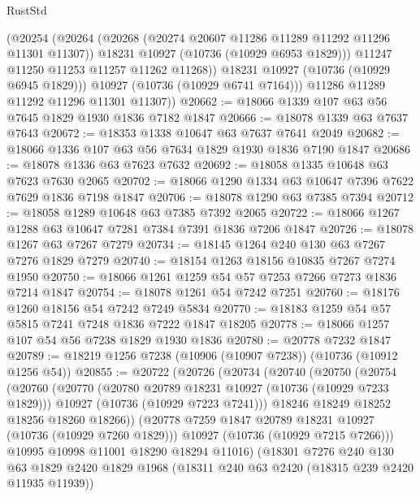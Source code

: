 \begin{lexlean}{RustStd}
\begin{coremodule}
              (@20254
                (@20264
                  (@20268 (@20274 @20607 @11286 @11289 @11292 @11296 @11301 @11307))
                  @18231
                  @10927
                  (@10736 (@10929 @6953 @1829)))
                @11247
                @11250
                @11253
                @11257
                @11262
                @11268))
            @18231
            @10927
            (@10736 (@10929 @6945 @1829)))
          @10927
          (@10736 (@10929 @6741 @7164)))
        @11286
        @11289
        @11292
        @11296
        @11301
        @11307))
@20662 := @18066 @1339 @107 @63 @56 @7645 @1829 @1930 @1836 @7182 @1847
@20666 := @18078 @1339 @63 @7637 @7643
@20672 := @18353 @1338 @10647 @63 @7637 @7641 @2049
@20682 := @18066 @1336 @107 @63 @56 @7634 @1829 @1930 @1836 @7190 @1847
@20686 := @18078 @1336 @63 @7623 @7632
@20692 := @18058 @1335 @10648 @63 @7623 @7630 @2065
@20702 := @18066 @1290 @1334 @63 @10647 @7396 @7622 @7629 @1836 @7198 @1847
@20706 := @18078 @1290 @63 @7385 @7394
@20712 := @18058 @1289 @10648 @63 @7385 @7392 @2065
@20722 := @18066 @1267 @1288 @63 @10647 @7281 @7384 @7391 @1836 @7206 @1847
@20726 := @18078 @1267 @63 @7267 @7279
@20734 := @18145 @1264 @240 @130 @63 @7267 @7276 @1829 @7279
@20740 := @18154 @1263 @18156 @10835 @7267 @7274 @1950
@20750 := @18066 @1261 @1259 @54 @57 @7253 @7266 @7273 @1836 @7214 @1847
@20754 := @18078 @1261 @54 @7242 @7251
@20760 := @18176 @1260 @18156 @54 @7242 @7249 @5834
@20770 := @18183 @1259 @54 @57 @5815 @7241 @7248 @1836 @7222 @1847 @18205
@20778 := @18066 @1257 @107 @54 @56 @7238 @1829 @1930 @1836
@20780 := @20778 @7232 @1847
@20789 := @18219 @1256 @7238 (@10906 (@10907 @7238)) (@10736 (@10912 @1256 @54))
@20855 := @20722
    (@20726
      (@20734
        (@20740
          (@20750
            (@20754
              (@20760
                (@20770
                  (@20780 @20789 @18231 @10927 (@10736 (@10929 @7233 @1829)))
                  @10927
                  (@10736 (@10929 @7223 @7241)))
                @18246
                @18249
                @18252
                @18256
                @18260
                @18266))
            (@20778 @7259 @1847 @20789 @18231 @10927 (@10736 (@10929 @7260 @1829)))
            @10927
            (@10736 (@10929 @7215 @7266)))
          @10995
          @10998
          @11001
          @18290
          @18294
          @11016)
        (@18301
          @7276
          @240
          @130
          @63
          @1829
          @2420
          @1829
          @1968
          (@18311 @240 @63 @2420 (@18315 @239 @2420 @11935 @11939))

\end{coremodule}
\end{lexlean}
